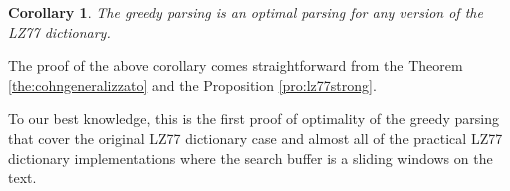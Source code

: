 \documentclass[12pt]{article}
\theoremstyle{plain}
\newtheorem{corollary}[theorem]{Corollary}
\theoremstyle{definition}
\theoremstyle{remark}
\begin{document}
\begin{corollary}
The greedy parsing is an optimal parsing for any version of the LZ77 dictionary.
\end{corollary}
The proof of the above corollary comes straightforward from the Theorem  \ref{the:cohngeneralizzato} and the Proposition \ref{pro:lz77strong}.

\medskip

To our best knowledge, this is the first proof of optimality of the greedy parsing that cover the original LZ77 dictionary case and almost all of the practical LZ77 dictionary implementations where the search buffer is a sliding windows on the text.





\end{document}
